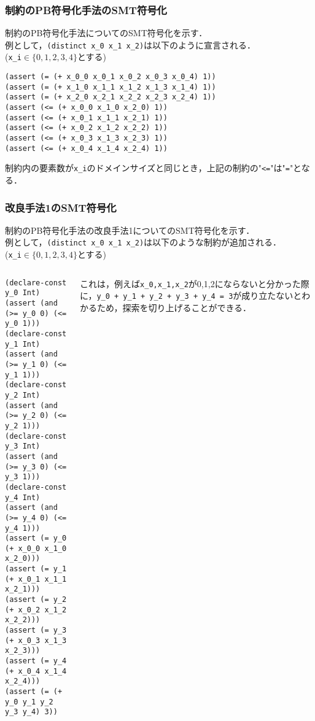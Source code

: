 \begin{frame}[fragile]
    \frametitle{\distinct 制約のPB符号化手法のSMT符号化}
    \distinct 制約のPB符号化手法についてのSMT符号化を示す．\\
    例として，\verb|(distinct x_0 x_1 x_2)|は以下のように宣言される．\\
    (\verb|x_i|$\in \{0,1,2,3,4\}$とする)
    \begin{exampleblock}{}\scriptsize
\begin{verbatim}
(assert (= (+ x_0_0 x_0_1 x_0_2 x_0_3 x_0_4) 1))
(assert (= (+ x_1_0 x_1_1 x_1_2 x_1_3 x_1_4) 1))
(assert (= (+ x_2_0 x_2_1 x_2_2 x_2_3 x_2_4) 1))
(assert (<= (+ x_0_0 x_1_0 x_2_0) 1))
(assert (<= (+ x_0_1 x_1_1 x_2_1) 1))
(assert (<= (+ x_0_2 x_1_2 x_2_2) 1))
(assert (<= (+ x_0_3 x_1_3 x_2_3) 1))
(assert (<= (+ x_0_4 x_1_4 x_2_4) 1))
\end{verbatim}
    \end{exampleblock}
    \distinct 制約内の要素数が\verb|x_i|のドメインサイズと同じとき，上記の制約の"\verb|<=|"は"\verb|=|"となる．
\end{frame}



\begin{frame}[fragile]\footnotesize
    \frametitle{改良手法1のSMT符号化}
    \distinct 制約のPB符号化手法の改良手法1についてのSMT符号化を示す．\\
    例として，\verb|(distinct x_0 x_1 x_2)|は以下のような制約が追加される．\\
    (\verb|x_i|$\in \{0,1,2,3,4\}$とする)

    \begin{columns}
        \begin{column}{0.5\textwidth}
            \begin{exampleblock}{}\scriptsize
\begin{verbatim}
(declare-const y_0 Int)
(assert (and (>= y_0 0) (<= y_0 1)))
(declare-const y_1 Int)
(assert (and (>= y_1 0) (<= y_1 1)))
(declare-const y_2 Int)
(assert (and (>= y_2 0) (<= y_2 1)))
(declare-const y_3 Int)
(assert (and (>= y_3 0) (<= y_3 1)))
(declare-const y_4 Int)
(assert (and (>= y_4 0) (<= y_4 1)))
(assert (= y_0 (+ x_0_0 x_1_0 x_2_0)))
(assert (= y_1 (+ x_0_1 x_1_1 x_2_1)))
(assert (= y_2 (+ x_0_2 x_1_2 x_2_2)))
(assert (= y_3 (+ x_0_3 x_1_3 x_2_3)))
(assert (= y_4 (+ x_0_4 x_1_4 x_2_4)))
(assert (= (+ y_0 y_1 y_2 y_3 y_4) 3))
\end{verbatim}
            \end{exampleblock}
        \end{column}
        \begin{column}{0.5\textwidth}\scriptsize
            これは，例えば\verb|x_0,x_1,x_2|が0,1,2にならないと分かった際に，\verb|y_0 + y_1 + y_2 + y_3 + y_4 = 3|が成り立たないとわかるため，探索を切り上げることができる．
        \end{column}
    \end{columns}
\end{frame}



